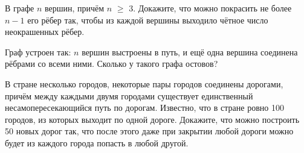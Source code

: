\documentclass[10pt,a4paper]{article}
\newlength{\shirinaokna}\setlength{\shirinaokna}{12mm}
\newlength{\vysotaokna}\setlength{\vysotaokna}{0.7\baselineskip}
\newcommand{\okno}{\framebox[\shirinaokna]{\rule{0pt}{\vysotaokna}}}
\newlength{\shirinanomera}\setlength{\shirinanomera}{9mm}
\newlength{\zazor}\setlength{\zazor}{0.6em}
\newcommand{\blok}[1]{\par\noindent #1\par}
\newcommand{\nomer}[2]{\makebox[\shirinanomera][l]{%
  \fbox{\rule{0pt}{\vysotaokna}\textbf{#1}$^{#2}$}}}
\begin{document}
\begin{samepage}
\blok{\nomer{12}{\star}\hspace{\zazor}\okno\hspace{\zazor}В графе $n$ вершин, причём $n$ $\geqslant$ 3. Докажите, что можно покрасить не более $n-1$ его рёбер так, чтобы из каждой вершины выходило чётное число неокрашенных рёбер.}
\end{samepage}\par\vspace{7pt}
\begin{samepage}
\blok{\nomer{13}{\star}\hspace{\zazor}\okno\hspace{\zazor}Граф устроен так: $n$ вершин выстроены в путь, и ещё одна вершина соединена рёбрами со всеми ними. Сколько у такого графа остовов?}
\end{samepage}\par\vspace{7pt}
\begin{samepage}
\blok{\nomer{14}{\star}\hspace{\zazor}\okno\hspace{\zazor}В стране несколько городов, некоторые пары городов соединены дорогами, причём между каждыми двумя городами существует единственный несамопересекающийся путь по дорогам. Известно, что в стране ровно 100 городов, из которых выходит по одной дороге. Докажите, что можно построить 50 новых дорог так, что после этого даже при закрытии любой дороги можно будет из каждого города попасть в любой другой.}
\end{samepage}\par\vspace{7pt}
\end{document}
